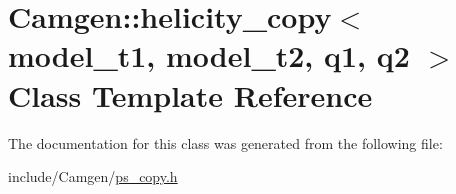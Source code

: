 \hypertarget{a00262}{\section{Camgen\-:\-:helicity\-\_\-copy$<$ model\-\_\-t1, model\-\_\-t2, q1, q2 $>$ Class Template Reference}
\label{a00262}
}


The documentation for this class was generated from the following file\-:\begin{DoxyCompactItemize}
\item 
include/\-Camgen/\hyperlink{a00712}{ps\-\_\-copy.\-h}\end{DoxyCompactItemize}
